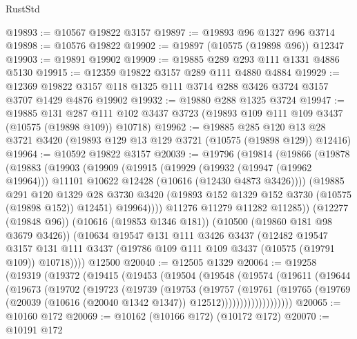 \begin{lexlean}{RustStd}
\begin{coremodule}
@19893 := @10567 @19822 @3157
@19897 := @19893 @96 @1327 @96 @3714
@19898 := @10576 @19822
@19902 := @19897 (@10575 (@19898 @96)) @12347
@19903 := @19891 @19902
@19909 := @19885 @289 @293 @111 @1331 @4886 @5130
@19915 := @12359 @19822 @3157 @289 @111 @4880 @4884
@19929 := @12369 @19822 @3157 @118 @1325 @111 @3714 @288 @3426 @3724 @3157 @3707 @1429 @4876 @19902
@19932 := @19880 @288 @1325 @3724
@19947 := @19885
    @131
    @287
    @111
    @102
    @3437
    @3723
    (@19893 @109 @111 @109 @3437 (@10575 (@19898 @109)) @10718)
@19962 := @19885
    @285
    @120
    @13
    @28
    @3721
    @3420
    (@19893 @129 @13 @129 @3721 (@10575 (@19898 @129)) @12416)
@19964 := @10592 @19822 @3157
@20039 := @19796
    (@19814
      (@19866
        (@19878
          (@19883
            (@19903
              (@19909
                (@19915
                  (@19929
                    (@19932 (@19947 (@19962 @19964)))
                    @11101
                    @10622
                    @12428
                    (@10616 (@12430 @4873 @3426))))
                (@19885
                  @291
                  @120
                  @1329
                  @28
                  @3730
                  @3420
                  (@19893 @152 @1329 @152 @3730 (@10575 (@19898 @152)) @12451)
                  @19964))))
          @11276
          @11279
          @11282
          @11285))
      (@12277 (@19848 @96))
      (@10616 (@19853 @1346 @181))
      (@10500 (@19860 @181 @98 @3679 @3426))
      (@10634
        @19547
        @131
        @111
        @3426
        @3437
        (@12482
          @19547
          @3157
          @131
          @111
          @3437
          (@19786 @109 @111 @109 @3437 (@10575 (@19791 @109)) @10718))))
    @12500
@20040 := @12505 @1329
@20064 := @19258
    (@19319
      (@19372
        (@19415
          (@19453
            (@19504
              (@19548
                (@19574
                  (@19611
                    (@19644
                      (@19673
                        (@19702
                          (@19723
                            (@19739
                              (@19753
                                (@19757
                                  (@19761
                                    (@19765
                                      (@19769
                                        (@20039
                                          (@10616 (@20040 @1342 @1347))
                                          @12512)))))))))))))))))))
@20065 := @10160 @172
@20069 := @10162 (@10166 @172) (@10172 @172)
@20070 := @10191 @172

\end{coremodule}
\end{lexlean}
